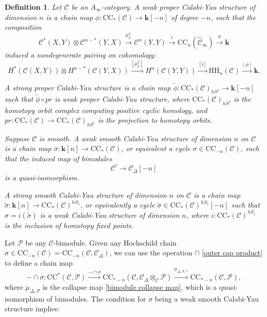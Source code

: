 \documentclass[11pt]{amsproc}
\def\K{{\mathbf{k}}}
\def\cP{\mathcal{P}}
\def\cc{\mathcal{C}}
\def\r#1{\mathrm{#1}}
\def\D{\Delta}
\def\ainf{A_\infty}
\def\cinf{\widehat{\cc}_{\infty}}
\newtheorem{defn}[lem]{Definition}
\theoremstyle{remark}
\numberwithin{equation}{section}
\begin{document}
\begin{defn}\label{def: cy structures}
Let $\cc$ be an $\ainf$-category.
A weak proper Calabi-Yau structure of dimension $n$ is a chain map $\phi: \r{CC}_{*}(\cc) \to \K[-n]$ of degree $-n$,
such that the composition
\begin{equation}
\cc^{*}(X, Y) \otimes \cc^{n-*}(Y, X) \stackrel{\mu_{\cc}^{2}}\to \cc^{n}(Y, Y) \stackrel{i}\to \r{CC}_{n}(\cinf) \stackrel{\phi}\to \K
\end{equation}
induced a nondegenerate pairing on cohomology:
\begin{equation}
H^{*}(\cc(X, Y)) \otimes H^{n-*}(\cc(Y, X)) \stackrel{[\mu_{\cc}^{2}]}\to H^{n}(\cc(Y, Y)) \stackrel{[i]}\to \r{HH}_{n}(\cc) \stackrel{[\phi]}\to \K.
\end{equation}

A strong proper Calabi-Yau structure is a chain map $\tilde{\phi}: \r{CC}_{*}(\cc)_{hS^{1}} \to \K[-n]$ such that $\tilde{\phi} \circ pr$ is weak proper Calabi-Yau structure,
where $\r{CC}_{*}(\cc)_{hS^{1}}$ is the homotopy orbit complex computing positive cyclic homology, 
and $pr: \r{CC}_{*}(\cc) \to \r{CC}_{*}(\cc)_{hS^{1}}$ is the projection to homotopy orbits.

Suppose $\cc$ is smooth. A weak smooth Calabi-Yau structure of dimension $n$ on $\cc$ is a chain map $\sigma: \K[n] \to \r{CC}_{*}(\cc)$, or equivalent a cycle $\sigma \in \r{CC}_{-n}(\cc)$, 
such that the induced map of bimodules
\begin{equation}
\cc^{!} \to \cc_{\D}[-n]
\end{equation}
is a quasi-isomorphism.

A strong smooth Calabi-Yau structure of dimension $n$ on $\cc$ is a chain map $\tilde{\sigma}: \K[n] \to \r{CC}_{*}(\cc)^{hS_{1}}$, 
or equivalently a cycle $\tilde{\sigma} \in \r{CC}_{*}(\cc)^{hS_{1}}[-n]$
such that $\sigma = i(\tilde{\sigma})$ is a weak Calabi-Yau structure of dimension $n$, 
where $i: \r{CC}_{*}(\cc)^{hS_{1}}$ is the inclusion of homotopy fixed points.

\end{defn}

Let $\cP$ be any $\cc$-bimodule. 
Given any Hochschild chain $\sigma \in \r{CC}_{-n}(\cc) = \r{CC}_{-n}(\cc, \cc_{\D})$, we can use the operation $\sqcap$ \eqref{outer cap product} to define a chain map
\begin{equation}\label{capping with cy}
-\cap \sigma: \r{CC}^{*}(\cc, \cP) \stackrel{- \sqcap \sigma}\to \r{CC}_{*-n}(\cc, \cc_{\D} \otimes_{\cc} \cP) \stackrel{\mu_{\D, \cP, *}}\to \r{CC}_{*-n}(\cc, \cP),
\end{equation}
where $\mu_{\D, \cP}$ is the collapse map \eqref{bimodule collapse map}, which is a quasi-isomorphism of bimodules.
The condition for $\sigma$ being a weak smooth Calabi-Yau structure implies:
\end{document}
